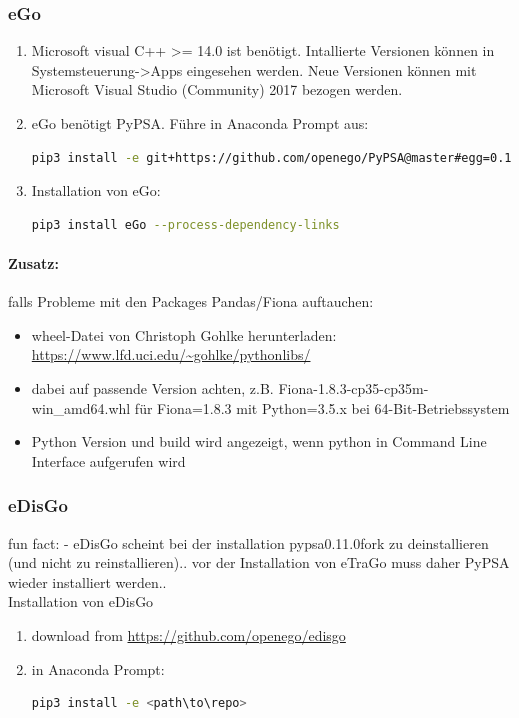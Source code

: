 \documentclass[
a4paper,     %
12pt         %
]{scrartcl}  %
\begin{document}
\subsubsection{eGo}
\begin{enumerate}
	\item Microsoft visual C++ >= 14.0 ist benötigt. Intallierte Versionen können in Systemsteuerung->Apps eingesehen werden. Neue Versionen können mit Microsoft Visual Studio (Community) 2017 bezogen werden.
	\item eGo benötigt PyPSA. Führe in Anaconda Prompt aus:
	\begin{lstlisting}[language=bash]
		pip3 install -e git+https://github.com/openego/PyPSA@master#egg=0.11.0fork
	\end{lstlisting}
	\item Installation von eGo:
	\begin{lstlisting}[language=bash]
		pip3 install eGo --process-dependency-links
	\end{lstlisting}
\end{enumerate}

\paragraph{Zusatz: }falls Probleme mit den Packages Pandas/Fiona auftauchen:
\begin{itemize}
\item wheel-Datei von Christoph Gohlke herunterladen: \url{https://www.lfd.uci.edu/~gohlke/pythonlibs/}
\item dabei auf passende Version achten, z.B. Fiona-1.8.3-cp35-cp35m-win\_amd64.whl für Fiona=1.8.3 mit Python=3.5.x bei 64-Bit-Betriebssystem
\item Python Version und build wird angezeigt, wenn python in Command Line Interface aufgerufen wird

\end{itemize}

\subsubsection{eDisGo}
fun fact: - eDisGo scheint bei der installation pypsa0.11.0fork zu deinstallieren (und nicht zu reinstallieren).. vor der Installation von eTraGo muss daher PyPSA wieder installiert werden..\\

Installation von eDisGo
\begin{enumerate}
	\item download from \url{https://github.com/openego/edisgo}\\
	\item in Anaconda Prompt:
	\begin{lstlisting}[language=bash]
		pip3 install -e <path\to\repo>
	\end{lstlisting}
\end{enumerate}
\end{document}
